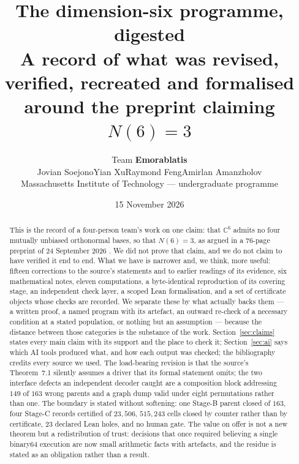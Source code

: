 \documentclass[10pt]{article}
\title{\bfseries The dimension-six programme, digested\\[4pt]
\large A record of what was revised, verified, recreated and formalised\\
\large around the preprint claiming $N(6)=3$}
\author{Team \textbf{Emorablatis}\\[4pt]
Jovian Soejono\quad Yian Xu\quad Raymond Feng\quad Amirlan Amanzholov\\[2pt]
Massachusetts Institute of Technology --- undergraduate programme\\[2pt]
\small\repoblurb}
\date{15 November 2026}
\theoremstyle{definition}
\newcommand{\C}{\mathbb{C}}
\begin{document}
\maketitle
\begin{abstract}
\noindent
This is the record of a four-person team's work on one claim: that $\C^6$ admits no four mutually
unbiased orthonormal bases, so that $N(6)=3$, as argued in a $76$-page preprint of 24 September 2026
\cite{ope26}. We did not prove that claim, and we do not claim to have verified it end to end. What we
have is narrower and, we think, more useful: fifteen corrections to the source's statements and to
earlier readings of its evidence, six mathematical notes, eleven computations, a byte-identical
reproduction of its covering stage, an independent check layer, a scoped Lean formalisation, and a set
of certificate objects whose checks are recorded. We separate these by what actually backs them --- a
written proof, a named program with its artefact, an outward re-check of a necessary condition at a
stated population, or nothing but an assumption --- because the distance between those categories is
the substance of the work. Section~\ref{sec:claims} states every main claim with its support and the
place to check it; Section~\ref{sec:ai} says which AI tools produced what, and how each output was
checked; the bibliography credits every source we used. The load-bearing revision is that the source's
Theorem~7.1 silently assumes a driver that its formal statement omits; the two interface defects an
independent decoder caught are a composition block addressing $149$ of $163$ wrong parents and a graph
dump valid under eight permutations rather than one. The boundary is stated without softening: one
Stage-B parent closed of $163$, four Stage-C records certified of $23{,}506$, $515{,}243$ cells closed
by counter rather than by certificate, $23$ declared Lean holes, and no human gate. The value on offer
is not a new theorem but a redistribution of trust: decisions that once required believing a single
binary64 execution are now small arithmetic facts with artefacts, and the residue is stated as an
obligation rather than a result.
\end{abstract}
\end{document}
